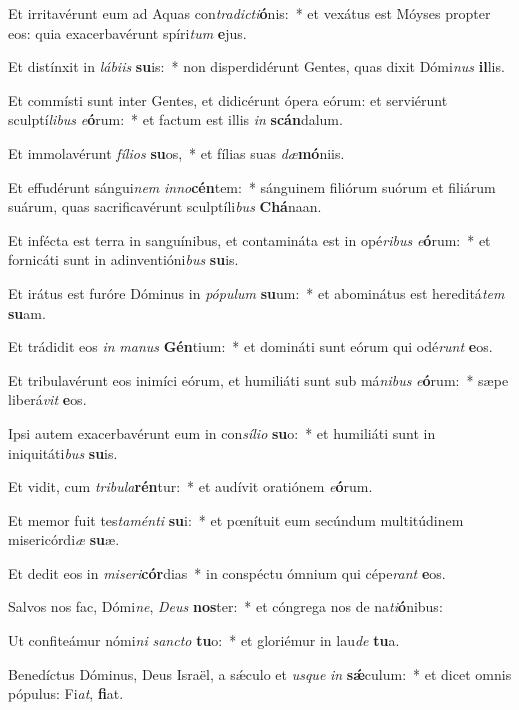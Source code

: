 \item Et irritavérunt eum ad Aquas con\textit{tra}\textit{dic}\textit{ti}\textbf{ó}nis:~* et vexátus est Móyses propter eos: quia exacerbavérunt spíri\textit{tum} \textbf{e}jus.
\item Et distínxit in \textit{lá}\textit{bi}\textit{is} \textbf{su}is:~* non disperdidérunt Gentes, quas dixit Dómi\textit{nus} \textbf{il}lis.
\item Et commísti sunt inter Gentes, et didicérunt ópera eórum: et serviérunt sculptí\textit{li}\textit{bus} \textit{e}\textbf{ó}rum:~* et factum est illis \textit{in} \textbf{scán}dalum.
\item Et immolavérunt \textit{fí}\textit{li}\textit{os} \textbf{su}os,~* et fílias suas \textit{dæ}\textbf{mó}niis.
\item Et effudérunt sángui\textit{nem} \textit{in}\textit{no}\textbf{cén}tem:~* sánguinem filiórum suórum et filiárum suárum, quas sacrificavérunt sculptíli\textit{bus} \textbf{Chá}naan.
\item Et infécta est terra in sanguínibus, et contamináta est in opé\textit{ri}\textit{bus} \textit{e}\textbf{ó}rum:~* et fornicáti sunt in adinventióni\textit{bus} \textbf{su}is.
\item Et irátus est furóre Dóminus in \textit{pó}\textit{pu}\textit{lum} \textbf{su}um:~* et abominátus est hereditá\textit{tem} \textbf{su}am.
\item Et trádidit eos \textit{in} \textit{ma}\textit{nus} \textbf{Gén}tium:~* et domináti sunt eórum qui odé\textit{runt} \textbf{e}os.
\item Et tribulavérunt eos inimíci eórum, et humiliáti sunt sub má\textit{ni}\textit{bus} \textit{e}\textbf{ó}rum:~* sæpe liberá\textit{vit} \textbf{e}os.
\item Ipsi autem exacerbavérunt eum in con\textit{sí}\textit{li}\textit{o} \textbf{su}o:~* et humiliáti sunt in iniquitáti\textit{bus} \textbf{su}is.
\item Et vidit, cum \textit{tri}\textit{bu}\textit{la}\textbf{rén}tur:~* et audívit oratiónem \textit{e}\textbf{ó}rum.
\item Et memor fuit tes\textit{ta}\textit{mén}\textit{ti} \textbf{su}i:~* et pœnítuit eum secúndum multitúdinem misericórdi\textit{æ} \textbf{su}æ.
\item Et dedit eos in \textit{mi}\textit{se}\textit{ri}\textbf{cór}dias~* in conspéctu ómnium qui cépe\textit{rant} \textbf{e}os.
\item Salvos nos fac, Dómi\textit{ne}, \textit{De}\textit{us} \textbf{nos}ter:~* et cóngrega nos de na\textit{ti}\textbf{ó}nibus:
\item Ut confiteámur nómi\textit{ni} \textit{sanc}\textit{to} \textbf{tu}o:~* et gloriémur in lau\textit{de} \textbf{tu}a.
\item Benedíctus Dóminus, Deus Israël, a sǽculo et \textit{us}\textit{que} \textit{in} \textbf{sǽ}culum:~* et dicet omnis pópulus: Fi\textit{at}, \textbf{fi}at.
